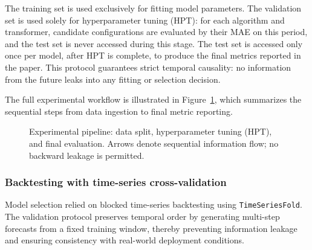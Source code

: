 The training set is used exclusively for fitting model parameters. The validation set is used solely for hyperparameter tuning (HPT): for each algorithm and transformer, candidate configurations are evaluated by their MAE on this period, and the test set is never accessed during this stage. The test set is accessed only once per model, after HPT is complete, to produce the final metrics reported in the paper. This protocol guarantees strict temporal causality: no information from the future leaks into any fitting or selection decision.

The full experimental workflow is illustrated in Figure~\ref{fig:pipeline}, which summarizes the sequential steps from data ingestion to final metric reporting.

\begin{figure}[!h]
\centering
\caption{Experimental pipeline: data split, hyperparameter tuning (HPT), and final evaluation. Arrows denote sequential information flow; no backward leakage is permitted.}
\label{fig:pipeline}
\end{figure}

\subsubsection{Backtesting with time-series cross-validation}

Model selection relied on blocked time-series backtesting using \texttt{TimeSeriesFold}. The validation protocol preserves temporal order by generating multi-step forecasts from a fixed training window, thereby preventing information leakage and ensuring consistency with real-world deployment conditions.

